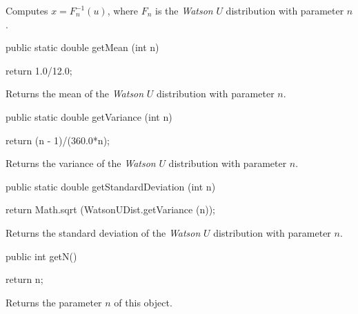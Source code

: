 \begin{tabb}
  Computes $x = F_n^{-1}(u)$, where $F_n$ is the 
  {\em Watson\/} $U$ distribution with parameter $n$.
\end{tabb}
\begin{code}

   public static double getMean (int n)\begin{hide} {
      return 1.0/12.0;
   }\end{hide}
\end{code}
\begin{tabb} Returns the mean of the {\em Watson\/} $U$  distribution with
   parameter $n$.
\end{tabb}
\begin{htmlonly}
\end{htmlonly}
\begin{code}

   public static double getVariance (int n)\begin{hide} {
      return (n - 1)/(360.0*n);
   }\end{hide}
\end{code}
\begin{tabb} Returns the variance of the {\em Watson\/} $U$ distribution with
   parameter $n$.
\end{tabb}
\begin{htmlonly}
\end{htmlonly}
\begin{code}

   public static double getStandardDeviation (int n)\begin{hide} {
      return Math.sqrt (WatsonUDist.getVariance (n));
   }\end{hide}
\end{code}
\begin{tabb} Returns the standard deviation of the {\em Watson\/} $U$
  distribution with parameter $n$.
\end{tabb}
\begin{htmlonly}
\end{htmlonly}
\begin{code}

   public int getN()\begin{hide} {
      return n;
   }\end{hide}
\end{code}
 \begin{tabb} Returns the parameter $n$ of this object.
 \end{tabb}
